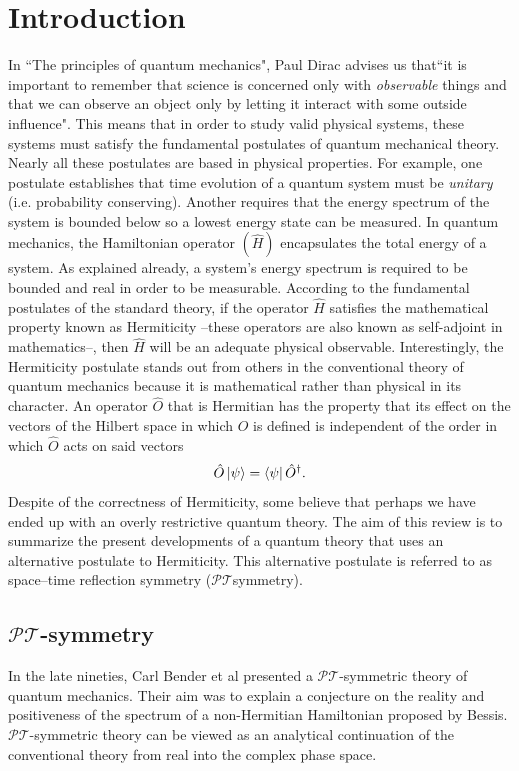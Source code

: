 \documentclass[12pt, a4paper]{report}
\newcommand\PT{\(\mathcal{PT}\)}
\begin{document}
\chapter{Introduction}\label{Introduction}
In ``The principles of quantum mechanics", Paul Dirac advises us that``it is important to remember that science is concerned only with \textit{observable} things and that we can observe an object only by letting it interact with some outside influence"\cite{POQM}. This means that in order to study valid physical systems, these systems must satisfy the fundamental postulates of quantum mechanical theory. Nearly all these postulates are based in physical properties. For example, one postulate establishes that time evolution of a quantum system must be \textit{unitary} (i.e. probability conserving). Another requires that the energy spectrum of the system is bounded below so a lowest energy state can be measured. In quantum mechanics, the Hamiltonian operator $(\hat{H})$ encapsulates the total energy of a system. As explained already, a system's energy spectrum is required to be bounded and real in order to be measurable. According to the fundamental postulates of the standard theory, if the operator $\hat{H}$ satisfies the mathematical property known as Hermiticity --these operators are also known as self-adjoint in mathematics--, then $\hat{H}$ will be an adequate physical observable. Interestingly, the Hermiticity postulate stands out from others in the conventional theory of quantum mechanics because it is mathematical rather than physical in its character\cite{MakingSense}.
An operator $\hat{O}$ that is Hermitian has the property that its effect on the vectors of the Hilbert space in which $\hat{O}$ is defined is independent of the order in which $\hat{O}$ acts on said vectors\cite{Jones-Smith}
\begin{equation}\label{eq:1.1}
\hat{O}\ket{\psi} = \bra{\psi}\hat{O}^{\dagger}.
\end{equation}
Despite of the correctness of Hermiticity, some believe that perhaps we have ended up with an overly restrictive quantum theory.  
The aim of this review is to summarize the present developments of a quantum theory that uses an alternative postulate to Hermiticity. This alternative postulate is referred to as space–time reflection symmetry (\PT\:symmetry)\cite{MustaHbeHermitian}. 

\section{\texorpdfstring{$\mathcal{PT}$}\:-symmetry}\label{PT}
In the late nineties, Carl Bender et al presented a \PT-symmetric theory of quantum mechanics. Their aim was to explain a conjecture on the reality and positiveness of the spectrum of a non-Hermitian Hamiltonian proposed by Bessis\cite{Bender1998}. \PT-symmetric theory can be viewed as an analytical continuation of the conventional theory from real into the complex phase space\cite{PTsymmetricQM}.
\end{document}
